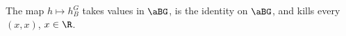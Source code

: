 The map $h\mapsto h_B^G$ takes values in $\aBG$, is the identity on $\aBG$, and kills every $(x,x)$, $x\in\R$.
